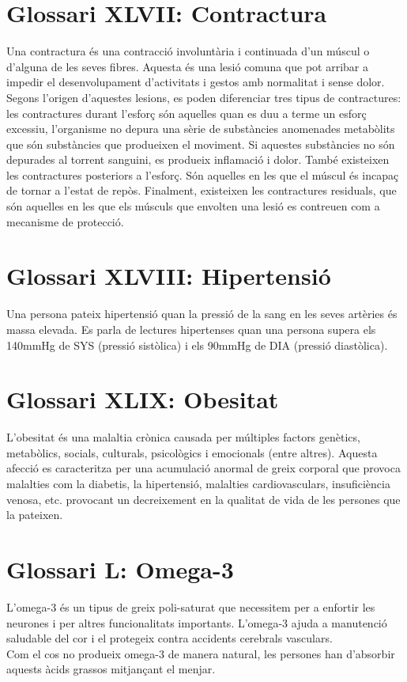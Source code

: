 \documentclass[a4paper,12pt]{report}
\begin{document}
\section*{Glossari XLVII: Contractura}
Una contractura és una contracció involuntària i continuada d'un múscul o d'alguna de les seves fibres. Aquesta és una lesió comuna que pot arribar a impedir el desenvolupament d'activitats i gestos amb normalitat i sense dolor.\\
Segons l'origen d'aquestes lesions, es poden diferenciar tres tipus de contractures: les contractures durant l'esforç són aquelles quan es duu a terme un esforç excessiu, l'organisme no depura una sèrie de substàncies anomenades metabòlits que són substàncies que produeixen el moviment. Si aquestes substàncies no són depurades al torrent sanguini, es produeix inflamació i dolor. També existeixen les contractures posteriors a l'esforç. Són aquelles en les que el múscul és incapaç de tornar a l'estat de repòs. Finalment, existeixen les contractures residuals, que són aquelles en les que els músculs que envolten una lesió es contreuen com a mecanisme de protecció.
\section*{Glossari XLVIII: Hipertensió}
Una persona pateix hipertensió quan la pressió de la sang en les seves artèries és massa elevada. Es parla de lectures hipertenses quan una persona supera els 140mmHg de SYS (pressió sistòlica) i els 90mmHg de DIA (pressió diastòlica).
\section*{Glossari XLIX: Obesitat}
L'obesitat és una malaltia crònica causada per múltiples factors genètics, metabòlics, socials, culturals, psicològics i emocionals (entre altres). Aquesta afecció es caracteritza per una acumulació anormal de greix corporal que provoca malalties com la diabetis, la hipertensió, malalties cardiovasculars, insuficiència venosa, etc. provocant un decreixement en la qualitat de vida de les persones que la pateixen.
\section*{Glossari L: Omega-3}
L'omega-3 és un tipus de greix poli-saturat que necessitem per a enfortir les neurones i per altres funcionalitats importants. L'omega-3 ajuda a manutenció saludable del cor i el protegeix contra accidents cerebrals vasculars.\\
Com el cos no produeix omega-3 de manera natural, les persones han d'absorbir aquests àcids grassos mitjançant el menjar.
\end{document}
